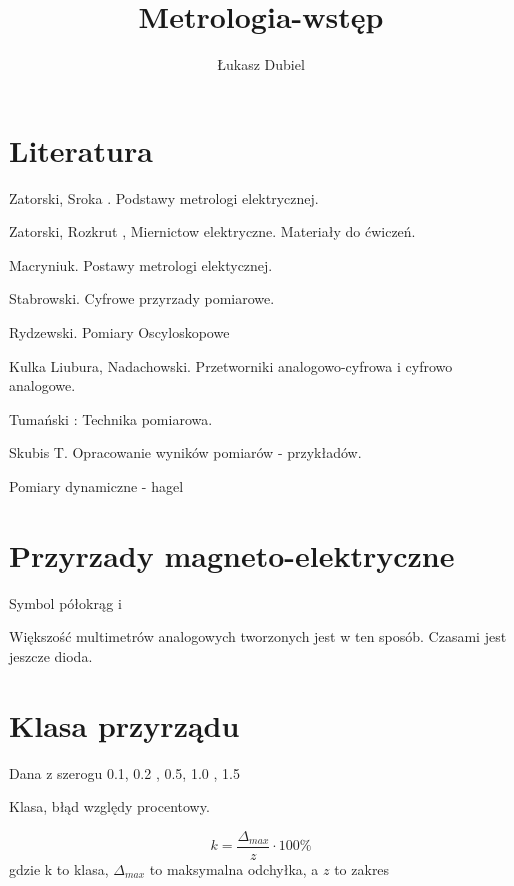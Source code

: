 \documentclass[11pt]{article}
\author{Łukasz Dubiel}
\title{Metrologia-wstęp}
\begin{document}
\maketitle

\section{Literatura}
Zatorski, Sroka  . Podstawy metrologi elektrycznej.

Zatorski, Rozkrut , Miernictow elektryczne. Materiały do ćwiczeń.

Macryniuk. Postawy metrologi elektycznej.

Stabrowski. Cyfrowe przyrzady pomiarowe.

Rydzewski. Pomiary Oscyloskopowe

Kulka Liubura, Nadachowski. Przetworniki analogowo-cyfrowa i cyfrowo analogowe.

Tumański : Technika pomiarowa.

Skubis T. Opracowanie wyników pomiarów - przykładów.

Pomiary dynamiczne - hagel

\section{Przyrzady magneto-elektryczne}

Symbol półokrąg i

Większość multimetrów analogowych tworzonych jest w ten sposób. Czasami jest jeszcze dioda.

\section{Klasa przyrządu}
Dana z szerogu 0.1, 0.2 , 0.5, 1.0 , 1.5

Klasa, błąd względy procentowy.

$$ k  = \frac{\Delta_{max}}{z} \cdot 100\% $$
gdzie k to klasa, $ \Delta_{max}$ to maksymalna odchyłka, a $z$ to zakres 
\end{document}
